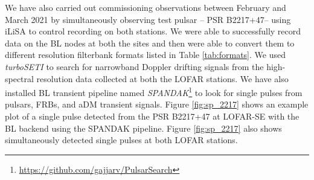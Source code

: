 \documentclass{aastex63}
\begin{document}
We have also carried out commissioning observations between February and March 2021 by simultaneously observing test pulsar -- PSR B2217+47-- using iLiSA to control recording on both stations. We were able to successfully record data on the BL nodes at both the sites and then were able to convert them to different resolution filterbank formats listed in Table \ref{tab:formats}. We used {\itshape turboSETI} to search for narrowband Doppler drifting signals from the high-spectral resolution data collected at both the LOFAR stations.  We have also installed BL transient pipeline named {\itshape SPANDAK}\footnote{\url{https://github.com/gajjarv/PulsarSearch}} \citep{gaj18apj} to look for single pulses from pulsars, FRBs, and aDM transient signals. Figure \ref{fig:sp_2217} shows an example plot of a single pulse detected from the PSR B2217+47 at LOFAR-SE with the BL backend using the SPANDAK pipeline. Figure \ref{fig:sp_2217} also shows simultaneously detected single pulses at both LOFAR stations. 
\end{document}
